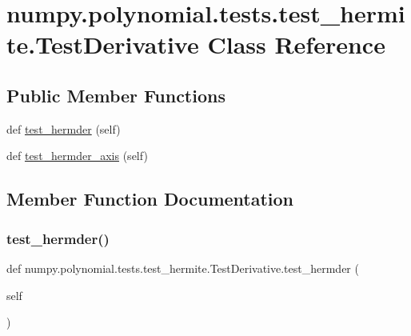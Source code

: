 \hypertarget{classnumpy_1_1polynomial_1_1tests_1_1test__hermite_1_1TestDerivative}{}\section{numpy.\+polynomial.\+tests.\+test\+\_\+hermite.\+Test\+Derivative Class Reference}
\label{classnumpy_1_1polynomial_1_1tests_1_1test__hermite_1_1TestDerivative}
\subsection*{Public Member Functions}
\begin{DoxyCompactItemize}
\item 
def \hyperlink{classnumpy_1_1polynomial_1_1tests_1_1test__hermite_1_1TestDerivative_a37f539f966d712c8d988d8696ed72db9}{test\+\_\+hermder} (self)
\item 
def \hyperlink{classnumpy_1_1polynomial_1_1tests_1_1test__hermite_1_1TestDerivative_a3d54737d9765ed0676e2ab671814f3bf}{test\+\_\+hermder\+\_\+axis} (self)
\end{DoxyCompactItemize}


\subsection{Member Function Documentation}
\mbox{\label{classnumpy_1_1polynomial_1_1tests_1_1test__hermite_1_1TestDerivative_a37f539f966d712c8d988d8696ed72db9}} 
\subsubsection{\texorpdfstring{test\+\_\+hermder()}{test\_hermder()}}
{\footnotesize\ttfamily def numpy.\+polynomial.\+tests.\+test\+\_\+hermite.\+Test\+Derivative.\+test\+\_\+hermder (\begin{DoxyParamCaption}\item[{}]{self }\end{DoxyParamCaption})}

